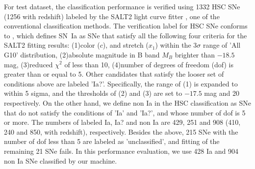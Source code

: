 \documentclass[useamsfonts]{pasj01}
\begin{document}
For test dataset, the classification performance is verified using 1332 HSC SNe (1256 with redshift) labeled by the SALT2 light curve fitter \citep{guy2007,guy10b}, one of the conventional classification methods.
The verification label for HSC SNe conforms to \citet{yasuda19a}, which defines SN~Ia as SNe that satisfy all the following four criteria for the SALT2 fitting results:
(1)color ($c$), and stretch ($x_1$) within the $3\sigma$ range of \citet{scolnickessler2016} 'All G10' distribution, 
(2)absolute magnitude in B band $M_B$ brighter than $-18.5$ mag, 
(3)reduced $\chi ^{2}$ of less than 10,
(4)number of degrees of freedom (dof) is greater than or equal to 5.
Other candidates that satisfy the looser set of conditions above are labeled 'Ia?'.
Specifically, the range of (1) is expanded to within 5 sigma, and the thresholds of (2) and (3) are set to $-17.5$ mag and 20 respectively.
On the other hand, we define non Ia in the HSC classification as SNe that do not satisfy the conditions of 'Ia' and 'Ia?', and whose number of dof is 5 or more.
The numbers of labeled Ia, Ia? and non Ia are 429, 251 and 908 (410, 240 and 850, with redshift), respectively.
Besides the above, 215 SNe with the number of dof less than 5 are labeled as 'unclassified', and fitting of the remaining 21 SNe fails.
In this performance evaluation, we use 428 Ia and 904 non Ia SNe classified by our machine.
\end{document}
